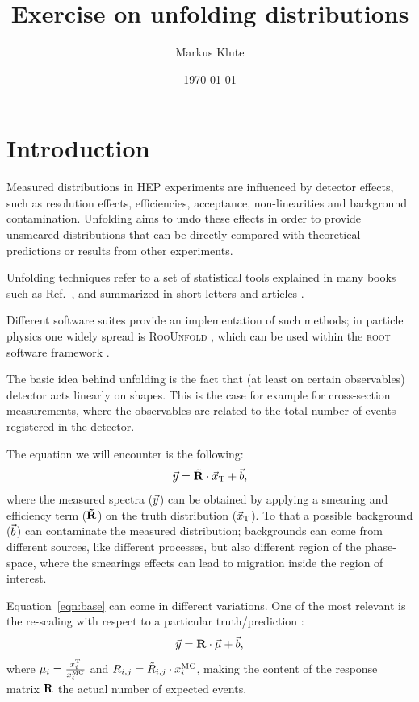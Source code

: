 \documentclass[a4paper,11pt]{article}
\title{Exercise on unfolding distributions}
\author{Markus Klute}
\date{\today}
\begin{document}
\maketitle

\section*{Introduction}
Measured distributions in \gls{HEP} experiments are influenced by detector effects, such as resolution effects, efficiencies, 
acceptance, non-linearities and background contamination.
Unfolding aims to undo these effects in order to provide unsmeared distributions that can be directly compared with theoretical predictions 
or results from other experiments.

Unfolding techniques refer to a set of statistical tools explained in many books such as Ref.~\cite{Cowan}, 
and summarized in short letters and articles \cite{Cowan:unfolding}. 

Different software suites provide an implementation of such methods; 
in particle physics one widely spread is {\scshape RooUnfold} \cite{RooUnfold}, 
which can be used within the {\scshape root} software framework \cite{ROOT}. 

The basic idea behind unfolding is the fact that (at least on certain observables) detector acts linearly on shapes.
This is the case for example for cross-section measurements, 
where the observables are related to the total number of events registered in the detector.

The equation we will encounter is the following:
\begin{equation}
	\vec{y}= \mathbf{\tilde{R}} \cdot \vec{x}_\textup{T} + \vec{b},
	\label{eqn:base}
\end{equation}
where the measured spectra ($\vec{y}$) can be obtained by applying a smearing and efficiency term ($\mathbf{\tilde{R}}$) on the truth distribution ($\vec{x}_\textup{T}$). 
To that a possible background ($\vec{b}$) can contaminate the measured distribution;
backgrounds can come from different sources, 
like different processes, but also different region of the phase-space,
where the smearings effects can lead to migration inside the region of interest.

Equation~\ref{eqn:base} can come in different variations.
One of the most relevant is the re-scaling with respect to a particular truth/prediction \cite{SVD}:
\begin{equation}
	\vec{y} = \mathbf{R} \cdot \vec{\mu} + \vec{b},
\end{equation}
where $\mu_{i} = \frac{x^\textup{T}_{i}}{x^\textup{MC}_{i}} $ and  $R_{i,j} = \tilde{R}_{i,j} \cdot x^\textup{MC}_{i} $, 
making the content of the response matrix $\mathbf{R}$ the actual number of expected events.
\end{document}
